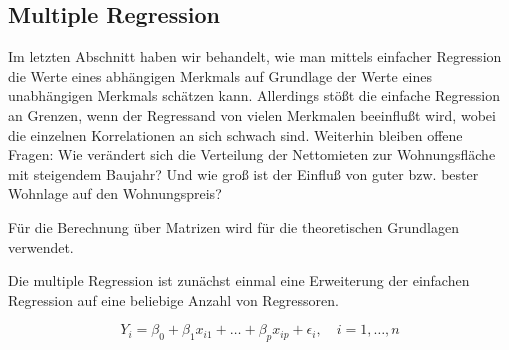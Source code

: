 \subsection{Multiple Regression}
\label{sec:mult_reg}

Im letzten Abschnitt haben wir behandelt, wie man mittels einfacher Regression die Werte eines abhängigen Merkmals auf Grundlage der Werte eines unabhängigen Merkmals schätzen kann.
Allerdings stößt die einfache Regression an Grenzen, wenn der Regressand von vielen Merkmalen beeinflußt wird, wobei die einzelnen Korrelationen an sich schwach sind.
Weiterhin bleiben offene Fragen: 
Wie verändert sich die Verteilung der Nettomieten zur Wohnungsfläche mit steigendem Baujahr?
Und wie groß ist der Einfluß von guter bzw. bester Wohnlage auf den Wohnungspreis? 

Für die Berechnung über Matrizen wird \cite{Fahrmeir1984} für die theoretischen Grundlagen verwendet.

Die multiple Regression ist zunächst einmal eine Erweiterung der einfachen Regression auf eine beliebige Anzahl von Regressoren.

\begin{equation}
  Y_i = \beta_0 + \beta_1 x_{i1} + \dots + \beta_p x_{ip} + \epsilon_i, \quad i = 1, \dots, n
\end{equation}

